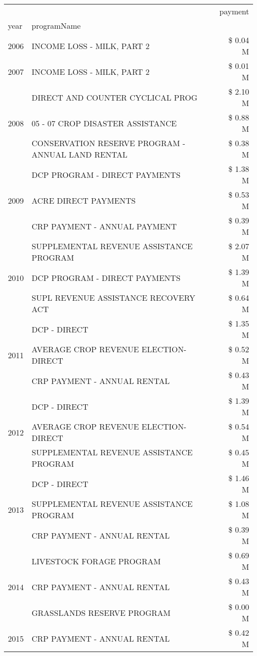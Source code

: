 \begin{tabular}{llr}
\toprule
 &  & payment \\
year & programName &  \\
\midrule
2006 & INCOME LOSS - MILK, PART 2 & \$ 0.04 M \\
\cline{1-3}
2007 & INCOME LOSS - MILK, PART 2 & \$ 0.01 M \\
\cline{1-3}
\multirow[t]{3}{*}{2008} & DIRECT AND COUNTER CYCLICAL PROG & \$ 2.10 M \\
 & 05 - 07 CROP DISASTER ASSISTANCE & \$ 0.88 M \\
 & CONSERVATION RESERVE PROGRAM - ANNUAL LAND RENTAL & \$ 0.38 M \\
\cline{1-3}
\multirow[t]{3}{*}{2009} & DCP PROGRAM - DIRECT PAYMENTS & \$ 1.38 M \\
 & ACRE DIRECT PAYMENTS & \$ 0.53 M \\
 & CRP PAYMENT - ANNUAL PAYMENT & \$ 0.39 M \\
\cline{1-3}
\multirow[t]{3}{*}{2010} & SUPPLEMENTAL REVENUE ASSISTANCE PROGRAM & \$ 2.07 M \\
 & DCP PROGRAM - DIRECT PAYMENTS & \$ 1.39 M \\
 & SUPL REVENUE ASSISTANCE RECOVERY ACT & \$ 0.64 M \\
\cline{1-3}
\multirow[t]{3}{*}{2011} & DCP - DIRECT & \$ 1.35 M \\
 & AVERAGE CROP REVENUE ELECTION-DIRECT & \$ 0.52 M \\
 & CRP PAYMENT - ANNUAL RENTAL & \$ 0.43 M \\
\cline{1-3}
\multirow[t]{3}{*}{2012} & DCP - DIRECT & \$ 1.39 M \\
 & AVERAGE CROP REVENUE ELECTION-DIRECT & \$ 0.54 M \\
 & SUPPLEMENTAL REVENUE ASSISTANCE PROGRAM & \$ 0.45 M \\
\cline{1-3}
\multirow[t]{3}{*}{2013} & DCP - DIRECT & \$ 1.46 M \\
 & SUPPLEMENTAL REVENUE ASSISTANCE PROGRAM & \$ 1.08 M \\
 & CRP PAYMENT - ANNUAL RENTAL & \$ 0.39 M \\
\cline{1-3}
\multirow[t]{3}{*}{2014} & LIVESTOCK FORAGE PROGRAM & \$ 0.69 M \\
 & CRP PAYMENT - ANNUAL RENTAL & \$ 0.43 M \\
 & GRASSLANDS RESERVE PROGRAM & \$ 0.00 M \\
\cline{1-3}
\multirow[t]{3}{*}{2015} & CRP PAYMENT - ANNUAL RENTAL & \$ 0.42 M \\

\end{tabular}
